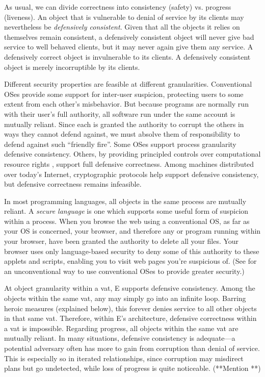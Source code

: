 \documentclass{llncs}
\begin{document}
As usual, we can divide correctness into consistency (safety)
vs. progress (liveness). An object that is vulnerable to denial of
service by its clients may nevertheless be \emph{defensively
consistent}. Given that all the objects it relies on themselves remain
consistent, a defensively consistent object will never give bad
service to well behaved clients, but it may never again give them any
service. A defensively correct object is invulnerable to its
clients. A defensively consistent object is merely incorruptible by
its clients.

Different security properties are feasible at different
granularities. Conventional OSes provide some support for inter-user
suspicion, protecting users to some extent from each other's
misbehavior. But because programs are normally run with their user's
full authority, all software run under the same account is mutually
reliant. Since each is granted the authority to corrupt the others in
ways they cannot defend against, we must absolve them of
responsibility to defend against such ``friendly fire''. Some OSes
\cite{dvh} support process granularity defensive consistency. Others,
by providing principled controls over computational resource rights
\cite{hardy:keykos,shapiro:eros}, support full defensive
correctness. Among machines distributed over today's Internet,
cryptographic protocols help support defensive consistency, but
defensive correctness remains infeasible.

In most programming languages, all objects in the same process are
mutually reliant. A \emph{secure language} is one which supports some
useful form of suspicion within a process. When you browse the web
using a conventional OS, as far as your OS is concerned, your browser,
and therefore any  or  program running
within your browser, have been granted the authority to delete all
your files. Your browser uses only language-based security to deny
some of this authority to these applets and scripts, enabling you to
visit web pages you're suspicious of. (See \cite{stiegler:polaris} for
an unconventional way to use conventional OSes to provide greater
security.)

At object granularity within a vat, E supports defensive
consistency. Among the objects within the same vat, any may simply go
into an infinite loop. Barring heroic measures (explained below), this
forever denies service to all other objects in that same
vat. Therefore, within E's architecture, defensive correctness within
a vat is impossible. Regarding progress, all objects within the same
vat are mutually reliant. In many situations, defensive consistency is
adequate---a potential adversary often has more to gain from
corruption than denial of service. This is especially so in iterated
relationships, since corruption may misdirect plans but go undetected,
while loss of progress is quite noticeable. (**Mention **)
\end{document}
